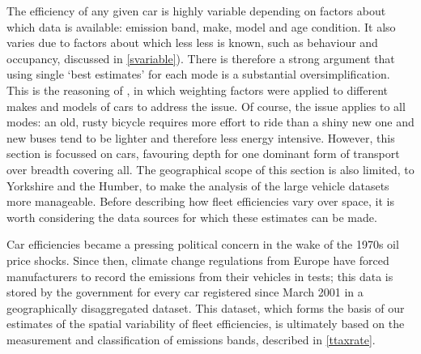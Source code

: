 The efficiency of any given car is highly variable depending on
factors about which data is available: emission band, make,
model and age condition. It also varies due to factors about which less
less is known, such as
behaviour and occupancy, discussed in \cref{svariable}). There is therefore a
strong argument that using single `best estimates' for each mode is a
substantial oversimplification.
This is the reasoning of \citet{Leith2007}, in which weighting
factors were applied to different makes and models of cars to address the issue.
Of course,
the issue applies to all modes: an old, rusty bicycle requires more effort
to ride than a shiny new one and new buses tend to be lighter and therefore
less energy intensive. However, this section is focussed on cars, favouring
depth for one dominant form of transport over breadth covering all.
The geographical scope of this section is also limited, to Yorkshire and the
Humber, to make the analysis of the large vehicle datasets more manageable.
Before describing how fleet efficiencies vary over space, it is worth
considering the data sources for which these estimates can be made.


\label{semdata}
Car efficiencies became a pressing political concern in the wake of the 1970s
oil price shocks. Since then, climate change regulations from Europe have
forced manufacturers to record the emissions from their vehicles in tests;
this data is stored by the government for every car registered since March
2001 in a geographically disaggregated dataset. This dataset, which forms the
basis of our estimates of the spatial variability of fleet efficiencies,
is ultimately based on the measurement and classification of emissions bands,
described in \cref{ttaxrate}.

